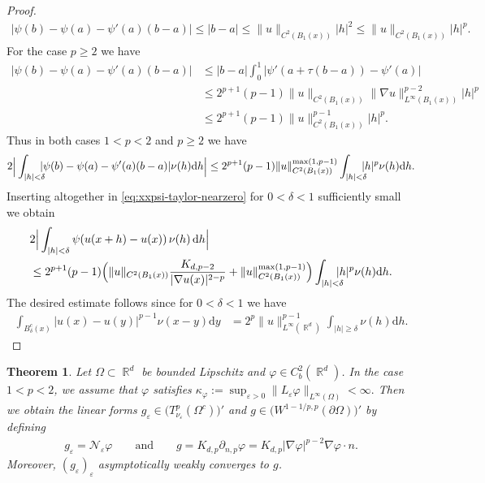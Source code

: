 \documentclass[12pt, reqno]{amsart}%
\theoremstyle{plain}  %
\newtheorem{theorem}{Theorem}[section]
\theoremstyle{definition}  %
\numberwithin{equation}{section}
\DeclareMathOperator{\R}{\mathbb{R}}
\renewcommand{\d}{\mathrm{d}}
\newcommand{\eps}{\varepsilon}
\newcommand{\TnuOma}{T^p_{\nu_\eps} (\Omega^c)}
\begin{document}
\begin{proof}
\begin{align*}
|\psi(b)-\psi(a) -\psi'(a)(b-a)| \leq |b-a|\leq \|u\|_{C^2(B_1(x))}|h|^2\leq \|u\|_{C^2(B_1(x))}|h|^p.
\end{align*}
For the case $p\geq 2$ we have
\begin{align*}
|\psi(b)-\psi(a)-\psi'(a)(b-a)|
&\leq |b-a| \int_0^1  |\psi'(a+\tau (b-a))- \psi'(a)|\\
&\leq 2^{p+1}(p-1)\|u\|_{C^2(B_1(x))}
\|\nabla u\|^{p-2}_{L^\infty(B_1(x))}
|h|^p\\
&\leq 2^{p+1}(p-1)\|u\|^{p-1}_{C^2(B_1(x))} |h|^p.
\end{align*}
Thus in both cases $1<p<2$  and $p\geq 2$ we have
\begin{align*}
\footnotesize
2\Big|\int_{|h|<\delta }\hspace*{-2ex}|\psi(b)-\psi(a) -\psi'(a)(b-a)| \nu(h)
\d h\Big| \leq 2^{p+1}(p-1) \|u\|^{\max(1, p-1)}_{C^2(B_1(x))}\int_{|h|<\delta } \hspace*{-2ex}|h|^p\nu(h)\d h.
\end{align*}
Inserting altogether in \eqref{eq:xxpsi-taylor-nearzero} for $0<\delta<1$ sufficiently small we obtain
\begin{align*}
&2\Big|\int_{|h|<\delta } \psi(u(x+h)-u(x))\,\nu(h)\,\d h\Big|
\\
&\leq 2^{p+1}(p-1)
\Big( \|u\|_{C^2(B_1(x))} \frac{K_{d,p-2}}{|\nabla u(x)|^{2-p}} +
\|u\|^{\max(1, p-1)}_{C^2(B_1(x))}\Big)\int_{|h|<\delta }\hspace*{-2ex} |h|^p\nu(h)\d h.
\end{align*}
The desired estimate follows since for  $0<\delta<1$ we have
\begin{align*}
\int_{B^c_\delta(x)} |u(x)- u(y)|^{p-1}\nu(x-y)\d y
&= 2^{p}\|u\|^{p-1}_{L^\infty(\R^d)}\int_{|h|\geq \delta}  \nu(h) \d h.
\end{align*}
\end{proof}

\begin{theorem}\label{thm:exam-weak-trace}
Let $\Omega\subset \R^d$ be bounded Lipschitz and $\varphi\in C_b^2(\R^d)$.  In the case $1<p<2$, we assume that $\varphi$ satisfies $\kappa_\varphi:= \sup_{\eps>0}\|L_\eps \varphi\|_{L^\infty(\Omega)} <\infty.$ Then we  obtain the linear forms  $g_\eps\in  \big(\TnuOma\big)'$ and $g\in \big(W^{1-1/p ,p}(\partial \Omega)\big)'$ by defining
\begin{align*}
g_\eps =  \mathcal{N}_\eps \varphi
\qquad\text{and}\qquad
g= K_{d,p} \partial_{n,p}\varphi=  K_{d,p}  |\nabla \varphi|^{p-2} \nabla \varphi\cdot n.
\end{align*}
Moreover, $(g_\eps)_\eps$  asymptotically weakly converges to $g$.
\end{theorem}
\end{document}
